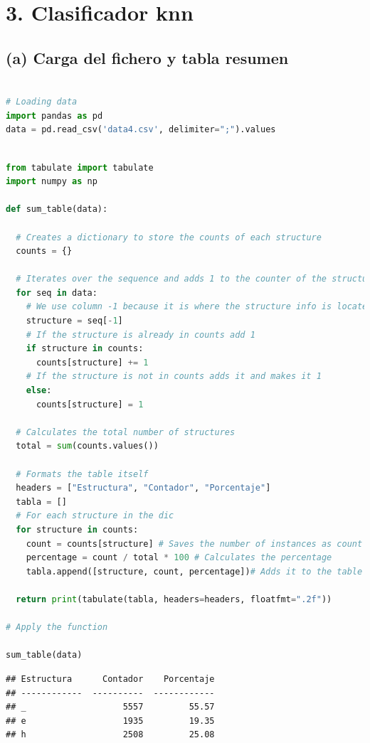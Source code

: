 \documentclass[
]{article}
\begin{document}
\hypertarget{clasificador-knn}{%
\section{3. Clasificador knn}\label{clasificador-knn}}

\hypertarget{a-carga-del-fichero-y-tabla-resumen}{%
\subsection{(a) Carga del fichero y tabla
resumen}\label{a-carga-del-fichero-y-tabla-resumen}}

\begin{lstlisting}[language=Python]

# Loading data
import pandas as pd
data = pd.read_csv('data4.csv', delimiter=";").values
\end{lstlisting}

\begin{lstlisting}[language=Python]

from tabulate import tabulate
import numpy as np

def sum_table(data):
  
  # Creates a dictionary to store the counts of each structure
  counts = {}

  # Iterates over the sequence and adds 1 to the counter of the structure encountered
  for seq in data:
    # We use column -1 because it is where the structure info is located
    structure = seq[-1]
    # If the structure is already in counts add 1
    if structure in counts:
      counts[structure] += 1
    # If the structure is not in counts adds it and makes it 1
    else:
      counts[structure] = 1

  # Calculates the total number of structures
  total = sum(counts.values())

  # Formats the table itself
  headers = ["Estructura", "Contador", "Porcentaje"]
  tabla = []
  # For each structure in the dic
  for structure in counts:
    count = counts[structure] # Saves the number of instances as count
    percentage = count / total * 100 # Calculates the percentage
    tabla.append([structure, count, percentage])# Adds it to the table
  
  return print(tabulate(tabla, headers=headers, floatfmt=".2f"))

# Apply the function

sum_table(data)
\end{lstlisting}

\begin{lstlisting}
## Estructura      Contador    Porcentaje
## ------------  ----------  ------------
## _                   5557         55.57
## e                   1935         19.35
## h                   2508         25.08
\end{lstlisting}
\end{document}
